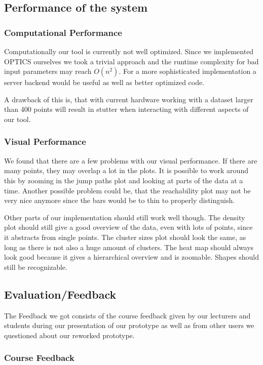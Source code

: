 \documentclass{vgtc} %
\begin{document}
\subsection{Performance of the system}
\subsubsection{Computational Performance}

Computationally our tool is currently not well optimized. Since we implemented OPTICS ourselves we took a trivial approach and the runtime complexity for bad input parameters may reach $ O(n^{2}) $. For a more sophisticated implementation a server backend would be useful as well as better optimized code.

A drawback of this is, that with current hardware working with a dataset larger than 400 points will result in stutter when interacting with different aspects of our tool.

\subsubsection{Visual Performance}
We found that there are a few problems with our visual performance. If there are many points, they may overlap a lot in the plots. It is possible to work around this by zooming in the jump paths plot and looking at parts of the data at a time. Another possible problem could be, that the reachability plot may not be very nice anymore since the bars would be to thin to properly distinguish.

Other parts of our implementation should still work well though. The density plot should still give a good overview of the data, even with lots of points, since it abstracts from single points. The cluster sizes plot should look the same, as long as there is not also a huge amount of clusters. The heat map should always look good because it gives a hierarchical overview and is zoomable. Shapes should still be recognizable.
\subsection{Evaluation/Feedback}
The Feedback we got consists of the course feedback given by our lecturers and students during our presentation of our prototype as well as from other users we questioned about our reworked prototype.
\subsubsection{Course Feedback}
\end{document}
